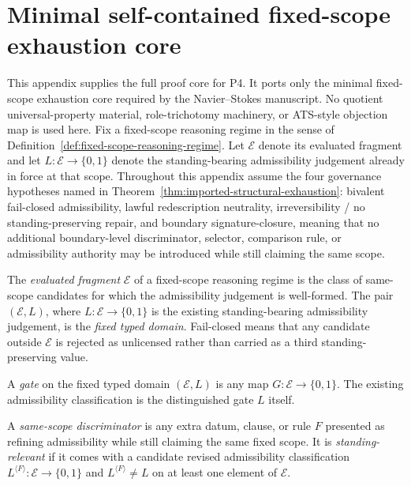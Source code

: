 \clearpage
\section{Minimal self-contained fixed-scope exhaustion core}

This appendix supplies the full proof core for P4. It ports only the minimal fixed-scope exhaustion core required by the Navier--Stokes manuscript. No quotient universal-property material, role-trichotomy machinery, or ATS-style objection map is used here. Fix a fixed-scope reasoning regime in the sense of Definition~\ref{def:fixed-scope-reasoning-regime}. Let $\mathcal E$ denote its evaluated fragment and let $L:\mathcal E\to\{0,1\}$ denote the standing-bearing admissibility judgement already in force at that scope. Throughout this appendix assume the four governance hypotheses named in Theorem~\ref{thm:imported-structural-exhaustion}: bivalent fail-closed admissibility, lawful redescription neutrality, irreversibility / no standing-preserving repair, and boundary signature-closure, meaning that no additional boundary-level discriminator, selector, comparison rule, or admissibility authority may be introduced while still claiming the same scope.

\begin{manualdefinition}
\label{def:p4-evaluated-fragment}
The \emph{evaluated fragment} $\mathcal E$ of a fixed-scope reasoning regime is the class of same-scope candidates for which the admissibility judgement is well-formed. The pair $(\mathcal E,L)$, where $L:\mathcal E\to\{0,1\}$ is the existing standing-bearing admissibility judgement, is the \emph{fixed typed domain}. Fail-closed means that any candidate outside $\mathcal E$ is rejected as unlicensed rather than carried as a third standing-preserving value.
\end{manualdefinition}

\begin{manualdefinition}
\label{def:p4-gate}
A \emph{gate} on the fixed typed domain $(\mathcal E,L)$ is any map $G:\mathcal E\to\{0,1\}$. The existing admissibility classification is the distinguished gate $L$ itself.
\end{manualdefinition}

\begin{manualdefinition}
\label{def:p4-standing-relevant-discriminator}
A \emph{same-scope discriminator} is any extra datum, clause, or rule $F$ presented as refining admissibility while still claiming the same fixed scope. It is \emph{standing-relevant} if it comes with a candidate revised admissibility classification $L^{\langle F\rangle}:\mathcal E\to\{0,1\}$ and $L^{\langle F\rangle}\neq L$ on at least one element of $\mathcal E$.
\end{manualdefinition}


